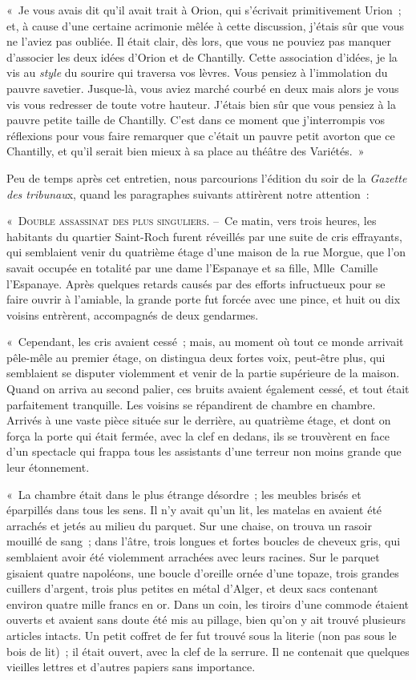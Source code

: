 \documentclass[french,twoside]{book} %
\begin{document}
\noindent « Je vous avais dit qu’il avait trait à Orion, qui s’écrivait primitivement Urion ; et, à cause d’une certaine acrimonie mêlée à cette discussion, j’étais sûr que vous ne l’aviez pas oubliée. Il était clair, dès lors, que vous ne pouviez pas manquer d’associer les deux idées d’Orion et de Chantilly. Cette association d’idées, je la vis au \emph{style} du sourire qui traversa vos lèvres. Vous pensiez à l’immolation du pauvre savetier. Jusque-là, vous aviez marché courbé en deux mais alors je vous vis vous redresser de toute votre hauteur. J’étais bien sûr que vous pensiez à la pauvre petite taille de Chantilly. C’est dans ce moment que j’interrompis vos réflexions pour vous faire remarquer que c’était un pauvre petit avorton que ce Chantilly, et qu’il serait bien mieux à sa place au théâtre des Variétés. »\par
Peu de temps après cet entretien, nous parcourions l’édition du soir de la \emph{Gazette des tribunau}x, quand les paragraphes suivants attirèrent notre attention :\par
« {\scshape Double assassinat des plus singuliers}. – Ce matin, vers trois heures, les habitants du quartier Saint-Roch furent réveillés par une suite de cris effrayants, qui semblaient venir du quatrième étage d’une maison de la rue Morgue, que l’on savait occupée en totalité par une dame l’Espanaye et sa fille, Mlle Camille l’Espanaye. Après quelques retards causés par des efforts infructueux pour se faire ouvrir à l’amiable, la grande porte fut forcée avec une pince, et huit ou dix voisins entrèrent, accompagnés de deux gendarmes.\par
« Cependant, les cris avaient cessé ; mais, au moment où tout ce monde arrivait pêle-mêle au premier étage, on distingua deux fortes voix, peut-être plus, qui semblaient se disputer violemment et venir de la partie supérieure de la maison. Quand on arriva au second palier, ces bruits avaient également cessé, et tout était parfaitement tranquille. Les voisins se répandirent de chambre en chambre. Arrivés à une vaste pièce située sur le derrière, au quatrième étage, et dont on força la porte qui était fermée, avec la clef en dedans, ils se trouvèrent en face d’un spectacle qui frappa tous les assistants d’une terreur non moins grande que leur étonnement.\par
« La chambre était dans le plus étrange désordre ; les meubles brisés et éparpillés dans tous les sens. Il n’y avait qu’un lit, les matelas en avaient été arrachés et jetés au milieu du parquet. Sur une chaise, on trouva un rasoir mouillé de sang ; dans l’âtre, trois longues et fortes boucles de cheveux gris, qui semblaient avoir été violemment arrachées avec leurs racines. Sur le parquet gisaient quatre napoléons, une boucle d’oreille ornée d’une topaze, trois grandes cuillers d’argent, trois plus petites en métal d’Alger, et deux sacs contenant environ quatre mille francs en or. Dans un coin, les tiroirs d’une commode étaient ouverts et avaient sans doute été mis au pillage, bien qu’on y ait trouvé plusieurs articles intacts. Un petit coffret de fer fut trouvé sous la literie (non pas sous le bois de lit) ; il était ouvert, avec la clef de la serrure. Il ne contenait que quelques vieilles lettres et d’autres papiers sans importance.\par
\end{document}
